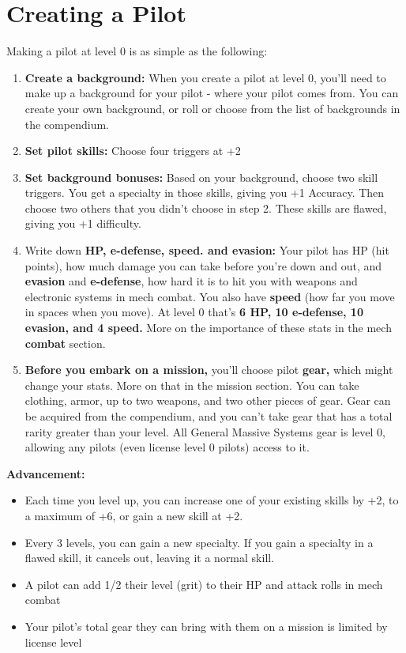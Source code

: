 \section{Creating a Pilot}

Making a pilot at level 0 is as simple as the following:

\begin{enumerate}
\item \textbf{Create a background:} When you create a pilot at level 0, you'll need to make up a background for your pilot - where your pilot comes from. You can create your own background, or roll or choose from the list of backgrounds in the compendium.
\item \textbf{Set pilot skills:} Choose four triggers at +2
\item \textbf{Set background bonuses:} Based on your background, choose two skill triggers. You get a specialty in those skills, giving you +1 Accuracy. Then choose two others that you didn't choose in step 2. These skills are flawed, giving you +1 difficulty.
\item Write down \textbf{HP, e-defense, speed. and evasion:} Your pilot has HP (hit points), how much damage you can take before you're down and out, and \textbf{evasion} and \textbf{e-defense}, how hard it is to hit you with weapons and electronic systems in mech combat. You also have \textbf{speed} (how far you move in spaces when you move). At level 0 that's \textbf{6 HP, 10 e-defense, 10 evasion, and 4 speed.} More on the importance of these stats in the mech \textbf{combat} section.
\item \textbf{Before you embark on a mission,} you'll choose pilot \textbf{gear,} which might change your stats. More on that in the mission section. You can take clothing, armor, up to two weapons, and two other pieces of gear. Gear can be acquired from the compendium, and you can't take gear that has a total rarity greater than your level. All General Massive Systems gear is level 0, allowing any pilots (even license level 0 pilots) access to it.
\end{enumerate}

\textbf{Advancement:}
\begin{itemize}
\item Each time you level up, you can increase one of your existing skills by +2, to a maximum of +6, or gain a new skill at +2.
\item Every 3 levels, you can gain a new specialty. If you gain a specialty in a flawed skill, it cancels out, leaving it a normal skill.
\item A pilot can add 1/2 their level (grit) to their HP and attack rolls in mech combat
\item Your pilot's total gear they can bring with them on a mission is limited by license level
\end{itemize}
